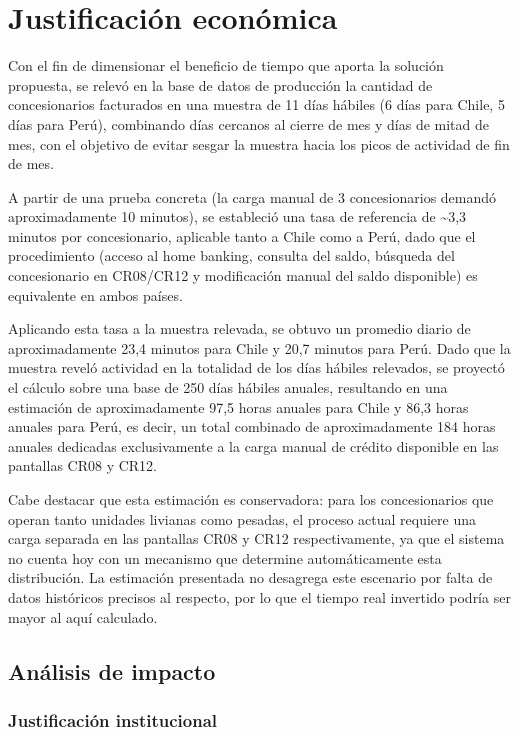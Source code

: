 \chapter{Justificación económica}\label{cap:justificacion-economica}

Con el fin de dimensionar el beneficio de tiempo que aporta la solución propuesta, se relevó en la base de datos de producción la cantidad de concesionarios facturados en una muestra de 11 días hábiles (6 días para Chile, 5 días para Perú), combinando días cercanos al cierre de mes y días de mitad de mes, con el objetivo de evitar sesgar la muestra hacia los picos de actividad de fin de mes.

A partir de una prueba concreta (la carga manual de 3 concesionarios demandó aproximadamente 10 minutos), se estableció una tasa de referencia de \textasciitilde3,3 minutos por concesionario, aplicable tanto a Chile como a Perú, dado que el procedimiento (acceso al home banking, consulta del saldo, búsqueda del concesionario en CR08/CR12 y modificación manual del saldo disponible) es equivalente en ambos países.

Aplicando esta tasa a la muestra relevada, se obtuvo un promedio diario de aproximadamente 23,4 minutos para Chile y 20,7 minutos para Perú. Dado que la muestra reveló actividad en la totalidad de los días hábiles relevados, se proyectó el cálculo sobre una base de 250 días hábiles anuales, resultando en una estimación de aproximadamente 97,5 horas anuales para Chile y 86,3 horas anuales para Perú, es decir, un total combinado de aproximadamente 184 horas anuales dedicadas exclusivamente a la carga manual de crédito disponible en las pantallas CR08 y CR12.

Cabe destacar que esta estimación es conservadora: para los concesionarios que operan tanto unidades livianas como pesadas, el proceso actual requiere una carga separada en las pantallas CR08 y CR12 respectivamente, ya que el sistema no cuenta hoy con un mecanismo que determine automáticamente esta distribución. La estimación presentada no desagrega este escenario por falta de datos históricos precisos al respecto, por lo que el tiempo real invertido podría ser mayor al aquí calculado.

\section{Análisis de impacto}

\subsection{Justificación institucional}

